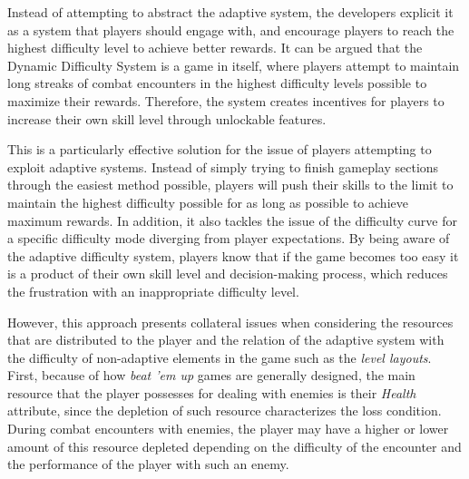 Instead of attempting to abstract the adaptive system, the developers explicit it as a system that players should engage with, and encourage players to reach the highest difficulty level to achieve better rewards. It can be argued that the Dynamic Difficulty System is a game in itself, where players attempt to maintain long streaks of combat encounters in the highest difficulty levels possible to maximize their rewards. Therefore, the system creates incentives for players to increase their own skill level through unlockable features.

This is a particularly effective solution for the issue of players attempting to exploit adaptive systems. Instead of simply trying to finish gameplay sections through the easiest method possible, players will push their skills to the limit to maintain the highest difficulty possible for as long as possible to achieve maximum rewards. In addition, it also tackles the issue of the difficulty curve for a specific difficulty mode diverging from player expectations. By being aware of the adaptive difficulty system, players know that if the game becomes too easy it is a product of their own skill level and decision-making process, which reduces the frustration with an inappropriate difficulty level.


However, this approach presents collateral issues when considering the resources that are distributed to the player and the relation of the adaptive system with the difficulty of non-adaptive elements in the game such as the \emph{level layouts}. First, because of how \emph{beat 'em up} games are generally designed, the main resource that the player possesses for dealing with enemies is their \emph{Health} attribute, since the depletion of such resource characterizes the loss condition. During combat encounters with enemies, the player may have a higher or lower amount of this resource depleted depending on the difficulty of the encounter and the performance of the player with such an enemy. 


